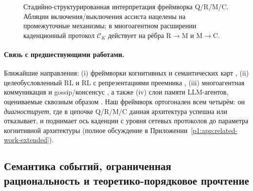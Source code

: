 \documentclass{article}
\begin{document}
\begin{figure}[t]
  \centering
  \caption{Стадийно-структурированная интерпретация фреймворка Q/R/M/C. Абляции включения/выключения ассиста нацелены на промежуточные механизмы; в многоагентном расширении каденционный протокол $\mathcal{C}_K$ действует на рёбра R$\to$M и M$\to$C.}
  \label{p1:fig:causal}
\end{figure}

\paragraph{Связь с предшествующими работами.} Ближайшие направления: (i) фреймворки когнитивных и семантических карт \citep{tolman1948cognitive,okeefe1978hippocampus,kuipers2000spatial,gupta2017cognitive,savinov2018semi}, (ii) целеобусловленный RL и RL с репрезентациями преемника \citep{andrychowicz2017hindsight,ghosh2021learning,dayan1993improving,stachenfeld2017hippocampus,momennejad2017successor}, (iii) многоагентная коммуникация \citep{lowe2017maddpg,foerster2018ctde,sukhbaatar2016commnet,foerster2016learning} и gossip/консенсус \citep{boyd2006gossip,xiao2007distributed}, а также (iv) слои памяти LLM-агентов, оцениваемые сквозным образом \citep{wang2023voyager,shinn2023reflexion,packer2023memgpt}. Наш фреймворк ортогонален всем четырём: он \emph{диагностирует}, где в цепочке Q/R/M/C данная архитектура успешна или отказывает, и поднимает ось каденции с уровня сетевых протоколов до параметра когнитивной архитектуры (полное обсуждение в Приложении~\ref{p1:app:related-work-extended}).

\subsection{Семантика событий, ограниченная рациональность и теоретико-порядковое прочтение}
\label{p1:sec:event-semantics}
\end{document}
